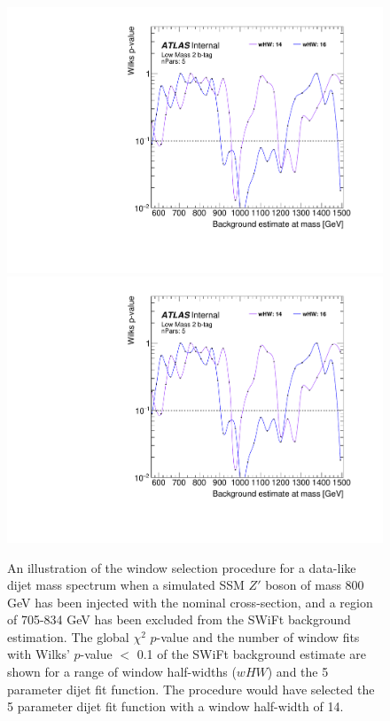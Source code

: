 \begin{figure}[!htb]
\captionsetup[subfigure]{aboveskip=0pt,justification=centering}
\centering
{} {
  \includegraphics[width=0.49\linewidth, angle=0,page=6]{figs/Dibjet/LowMass/FitStudy_min566/windowSel_corrFitCR_dataLike_v11_Zprimebb800_xsFactor1_removeWindow.pdf}
}\hspace{-8mm}
 {
  \includegraphics[width=0.49\linewidth, angle=0,page=8]{figs/Dibjet/LowMass/FitStudy_min566/windowSel_corrFitCR_dataLike_v11_Zprimebb800_xsFactor1_removeWindow.pdf}
}
\caption[An illustration of the window selection procedure for a data-like dijet mass spectrum when
          a simulated SSM $Z'$ boson of mass 800 GeV has been injected
          and a region of 705-834 GeV has been excluded from the SWiFt background estimation.]
        {\label{fig:windowSel_Zprimebb800_xsFactor1}
          An illustration of the window selection procedure for a data-like dijet mass spectrum when
          a simulated SSM $Z'$ boson of mass 800 GeV has been injected with the nominal cross-section,
          and a region of 705-834 GeV has been excluded from the SWiFt background estimation.
          The global $\chi^{2}$ \mbox{$p$-value} %
          and the number of window fits with Wilks' \mbox{$p$-value} $<$ 0.1 of the SWiFt background estimate are shown
          for a range of window half-widths ($wHW$) and the 5 parameter dijet fit function.
          The procedure would have selected the 5 parameter dijet fit function with a window half-width of 14.
}
\end{figure}

